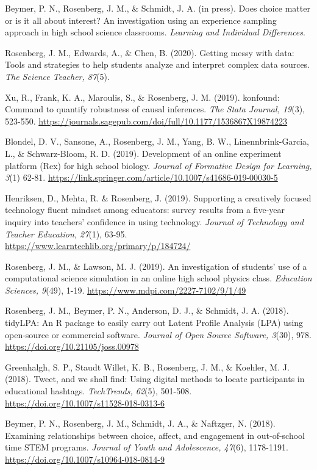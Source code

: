 \documentclass[14,]{article}
\begin{document}
Beymer, P. N., Rosenberg, J. M., \& Schmidt, J. A. (in press). Does
choice matter or is it all about interest? An investigation using an
experience sampling approach in high school science classrooms.
\emph{Learning and Individual Differences}.

Rosenberg, J. M., Edwards, A., \& Chen, B. (2020). Getting messy with
data: Tools and strategies to help students analyze and interpret
complex data sources. \emph{The Science Teacher, 87}(5).

Xu, R., Frank, K. A., Maroulis, S., \& Rosenberg, J. M. (2019).
konfound: Command to quantify robustness of causal inferences. \emph{The
Stata Journal, 19}(3), 523-550.
\url{https://journals.sagepub.com/doi/full/10.1177/1536867X19874223}

Blondel, D. V., Sansone, A., Rosenberg, J. M., Yang, B. W.,
Linennbrink-Garcia, L., \& Schwarz-Bloom, R. D. (2019). Development of
an online experiment platform (Rex) for high school biology.
\emph{Journal of Formative Design for Learning, 3}(1) 62-81.
\url{https://link.springer.com/article/10.1007/s41686-019-00030-5}

Henriksen, D., Mehta, R. \& Rosenberg, J. (2019). Supporting a
creatively focused technology fluent mindset among educators: survey
results from a five-year inquiry into teachers' confidence in using
technology. \emph{Journal of Technology and Teacher Education, 27}(1),
63-95. \url{https://www.learntechlib.org/primary/p/184724/}

Rosenberg, J. M., \& Lawson, M. J. (2019). An investigation of students'
use of a computational science simulation in an online high school
physics class. \emph{Education Sciences, 9}(49), 1-19.
\url{https://www.mdpi.com/2227-7102/9/1/49}

Rosenberg, J. M., Beymer, P. N., Anderson, D. J., \& Schmidt, J. A.
(2018). tidyLPA: An R package to easily carry out Latent Profile
Analysis (LPA) using open-source or commercial software. \emph{Journal
of Open Source Software, 3}(30), 978.
\url{https://doi.org/10.21105/joss.00978}

Greenhalgh, S. P., Staudt Willet, K. B., Rosenberg, J. M., \& Koehler,
M. J. (2018). Tweet, and we shall find: Using digital methods to locate
participants in educational hashtags. \emph{TechTrends, 62}(5), 501-508.
\url{https://doi.org/10.1007/s11528-018-0313-6}

Beymer, P. N., Rosenberg, J. M., Schmidt, J. A., \& Naftzger, N. (2018).
Examining relationships between choice, affect, and engagement in
out-of-school time STEM programs. \emph{Journal of Youth and
Adolescence, 47}(6), 1178-1191.
\url{https://doi.org/10.1007/s10964-018-0814-9}
\end{document}
